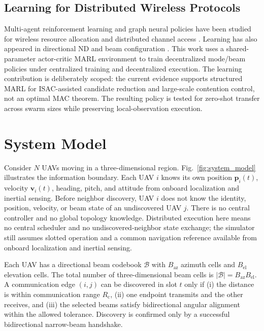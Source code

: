 \documentclass[journal]{IEEEtran}
\newcommand{\Rc}{R_{\mathrm{c}}}
\newcommand{\beamset}{\mathcal{B}}
\begin{document}
\subsection{Learning for Distributed Wireless Protocols}
Multi-agent reinforcement learning and graph neural policies have been studied for wireless resource allocation and distributed channel access \cite{Naderializadeh2021MADRLTWC,Eisen2020REGNN,Guo2022MARLMAC}.
Learning has also appeared in directional ND and beam configuration \cite{Wang2024RLDirectionalND}.
This work uses a shared-parameter actor-critic MARL environment to train decentralized mode/beam policies under centralized training and decentralized execution.
The learning contribution is deliberately scoped: the current evidence supports structured MARL for ISAC-assisted candidate reduction and large-scale contention control, not an optimal MAC theorem.
The resulting policy is tested for zero-shot transfer across swarm sizes while preserving local-observation execution.

\section{System Model}
Consider $N$ UAVs moving in a three-dimensional region.
Fig.~\ref{fig:system_model} illustrates the information boundary.
Each UAV $i$ knows its own position $\mathbf{p}_i(t)$, velocity $\mathbf{v}_i(t)$, heading, pitch, and attitude from onboard localization and inertial sensing.
Before neighbor discovery, UAV $i$ does not know the identity, position, velocity, or beam state of an undiscovered UAV $j$.
There is no central controller and no global topology knowledge.
Distributed execution here means no central scheduler and no undiscovered-neighbor state exchange; the simulator still assumes slotted operation and a common navigation reference available from onboard localization and inertial sensing.

Each UAV has a directional beam codebook $\beamset$ with $B_{\mathrm{az}}$ azimuth cells and $B_{\mathrm{el}}$ elevation cells.
The total number of three-dimensional beam cells is $|\beamset|=B_{\mathrm{az}}B_{\mathrm{el}}$.
A communication edge $(i,j)$ can be discovered in slot $t$ only if (i) the distance is within communication range $\Rc$, (ii) one endpoint transmits and the other receives, and (iii) the selected beams satisfy bidirectional angular alignment within the allowed tolerance.
Discovery is confirmed only by a successful bidirectional narrow-beam handshake.
\end{document}
